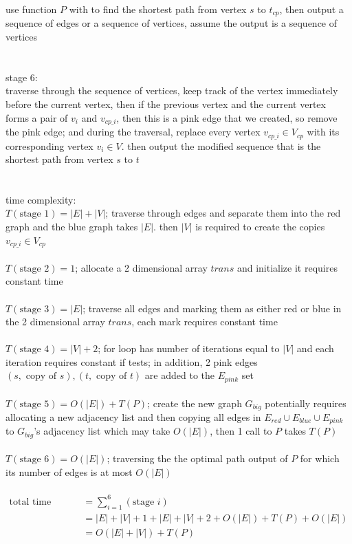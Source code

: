 \documentclass[12pt,border=4pt,multi]{article} %
\begin{document}
use function $P$ with to find the shortest path from vertex $s$ to $t_{cp}$, then output a sequence of edges or a sequence of vertices, assume the output is a sequence of vertices\\
\\
\\
stage 6:\\
traverse through the sequence of vertices, keep track of the vertex immediately before the current vertex, then if the previous vertex and the current vertex forms a pair of $v_i$ and $v_{cp\_i}$, then this is a pink edge that we created, so remove the pink edge; and during the traversal, replace every vertex $v_{cp\_i} \in V_{cp}$ with its corresponding vertex $v_i \in V$. then output the modified sequence that is the shortest path from vertex $s$ to $t$\\
\\
\\
time complexity:\\
$T(\text{stage 1}) = |E| + |V|$; traverse through edges and separate them into the red graph and the blue graph takes $|E|$. then $|V|$ is required to create the copies $v_{cp\_i} \in V_{cp}$\\
\\
$T(\text{stage 2}) = 1$; allocate a 2 dimensional array $trans$ and initialize it requires constant time\\
\\
$T(\text{stage 3}) = |E|$; traverse all edges and marking them as either red or blue in the 2 dimensional array $trans$, each mark requires constant time\\
\\
$T(\text{stage 4}) = |V| + 2$; for loop has number of iterations equal to $|V|$ and each iteration requires constant if tests; in addition, 2 pink edges $(s, \text{ copy of } s), (t, \text{ copy of } t)$ are added to the $E_{pink}$ set\\ 
\\
$T(\text{stage 5}) = O(|E|) + T(P)$; create the new graph $G_{big}$ potentially requires allocating a new adjacency list and then copying all edges in $E_{red} \cup E_{blue} \cup E_{pink}$ to $G_{big}$'s adjacency list which may take $O(|E|)$, then 1 call to $P$ takes $T(P)$\\
\\
$T(\text{stage 6}) = O(|E|)$; traversing the the optimal path output of $P$ for which its number of edges is at most $O(|E|)$\\
\\
\begin{align*}
\text{total time complexity} &= \sum_{i = 1}^6 (\text{stage } i)\\
&= |E| + |V| + 1 + |E| + |V| + 2 + O(|E|) + T(P) + O(|E|)\\
&= O(|E| + |V|) + T(P)\\
\end{align*}
\end{document}
